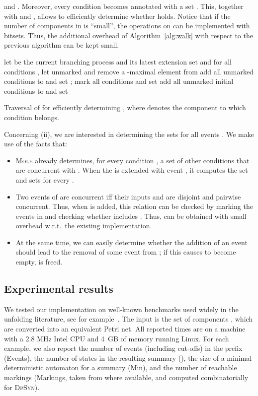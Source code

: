 \documentclass{llncs}
\begin{document}
and . Moreover, every condition  becomes annotated with
a set .
This, together with  and , allows
to efficiently determine whether  holds. Notice that if the
number of components in  is ``small'', the operations on 
can be implemented with bitsets. Thus, the additional overhead of
Algorithm~\ref{alg:walk} with respect to the previous algorithm can be
kept small.

\begin{algorithm}[htbp]
\begin{algorithmic}
\State let  be the current branching process and  its latest extension
\State set  and 
\State for all conditions , let  unmarked and 
\While{}
\State remove a -maximal element  from 
\State add all unmarked conditions  to  and set 
\State ;
\State mark all conditions  and set 
\EndWhile
\State add all unmarked initial conditions  to  and set 
\end{algorithmic}
\caption{Traversal of  for efficiently determining ,
where  denotes the component to which condition  belongs.}
\label{alg:walk}
\end{algorithm}

Concerning (ii), we are interested in determining the sets 
for all events . We make use of the facts that:
\begin{itemize}
\item \textsc{Mole} already determines, for every condition , a set
  of other conditions  that are concurrent with . When
  the  is extended with event , it computes the set
   and sets
   for every .
\item Two events  of  are concurrent iff their inputs 
  and  are disjoint and pairwise concurrent. Thus, when  is
  added, this relation can be checked by marking the events in  and
  checking whether  includes . Thus,  can be
  obtained with small overhead w.r.t.\ the existing implementation.
\item At the same time, we can easily determine whether the addition
  of an event  should lead to the removal of some event  from
  ; if this causes  to become empty,
   is freed.
\end{itemize}

\subsection{Experimental results}


We tested our implementation on well-known benchmarks
used widely in the unfolding literature,
see for example~\cite{Cor96,Esparza96,Khomenko03}.
The input is the set of components ,
which are converted into an equivalent Petri net. 
All reported times are on a machine with a 2.8 MHz Intel CPU and
4~GB of memory running Linux.
For each example, we
also report the number of events
(including cut-offs) in the prefix (Events),
the number of states
in the resulting summary  (), the size of a minimal deterministic
automaton for a summary (Min), and
the number of reachable
markings (Markings, taken from \cite{RoemerPhd} where
available, and computed combinatorially for \textsc{DpSyn}).
\end{document}
